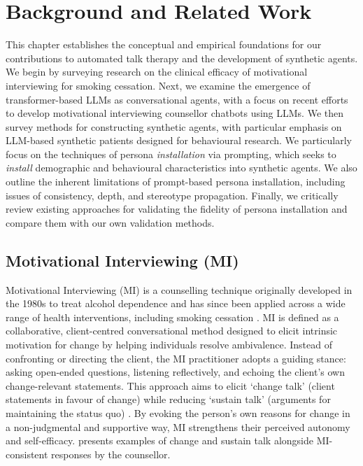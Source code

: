 \chapter{Background and Related Work}
\label{ch:background}
This chapter establishes the conceptual and empirical foundations for our contributions to automated talk therapy and the development of synthetic agents. We begin by surveying research on the clinical efficacy of motivational interviewing for smoking cessation. Next, we examine the emergence of transformer-based LLMs as conversational agents, with a focus on recent efforts to develop motivational interviewing counsellor chatbots using LLMs. We then survey methods for constructing synthetic agents, with particular emphasis on LLM-based synthetic patients designed for behavioural research. We particularly focus on the techniques of persona \emph{installation} via prompting, which seeks to \emph{install} demographic and behavioural characteristics into synthetic agents. We also outline the inherent limitations of prompt-based persona installation, including issues of consistency, depth, and stereotype propagation. Finally, we critically review existing approaches for validating the fidelity of persona installation and compare them with our own validation methods.

\section{Motivational Interviewing (MI)}
Motivational Interviewing (MI) is a counselling technique originally developed in the
1980s to treat alcohol dependence and has since been applied across a wide range of
health interventions, including smoking cessation \cite{Miller1983,
	MillerRollnick2023}. MI is defined as a collaborative, client-centred conversational
method designed to elicit intrinsic motivation for change by helping individuals
resolve ambivalence. Instead of confronting or directing the client, the MI
practitioner adopts a guiding stance: asking open-ended questions, listening
reflectively, and echoing the client's own change-relevant statements. This approach
aims to elicit `change talk' (client statements in favour of change) while reducing
`sustain talk' (arguments for maintaining the status quo) \cite{MillerRose2009}. By
evoking the person's own reasons for change in a non-judgmental and supportive way, MI
strengthens their perceived autonomy and self-efficacy. 
presents examples of change and sustain talk alongside MI-consistent responses by the
counsellor.

